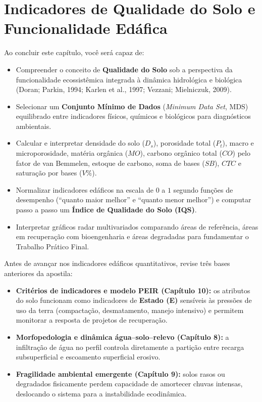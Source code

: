 \chapter{Indicadores de Qualidade do Solo e Funcionalidade Edáfica}
\label{cap:qualidade_solo}

\noindent\tagPratica
\vspace{4pt}

\begin{capObjetivos}
Ao concluir este capítulo, você será capaz de:
\begin{itemize}[leftmargin=1.5em, itemsep=2.5pt]
  \item Compreender o conceito de \textbf{Qualidade do Solo} sob a perspectiva da funcionalidade ecossistêmica integrada à dinâmica hidrológica e biológica (Doran; Parkin, 1994; Karlen et al., 1997; Vezzani; Mielniczuk, 2009).
  \item Selecionar um \textbf{Conjunto Mínimo de Dados} (\textit{Minimum Data Set}, MDS) equilibrado entre indicadores físicos, químicos e biológicos para diagnósticos ambientais.
  \item Calcular e interpretar densidade do solo ($D_s$), porosidade total ($P_t$), macro e microporosidade, matéria orgânica ($MO$), carbono orgânico total ($CO$) pelo fator de van Bemmelen, estoque de carbono, soma de bases ($SB$), $CTC$ e saturação por bases ($V\%$).
  \item Normalizar indicadores edáficos na escala de $0$ a $1$ segundo funções de desempenho (``quanto maior melhor'' e ``quanto menor melhor'') e computar passo a passo um \textbf{Índice de Qualidade do Solo (IQS)}.
  \item Interpretar gráficos radar multivariados comparando áreas de referência, áreas em recuperação com bioengenharia e áreas degradadas para fundamentar o Trabalho Prático Final.
\end{itemize}
\end{capObjetivos}

\begin{capRevisao}
Antes de avançar nos indicadores edáficos quantitativos, revise três bases anteriores da apostila:
\begin{itemize}[leftmargin=1.5em, itemsep=2.5pt]
  \item \textbf{Critérios de indicadores e modelo PEIR (Capítulo 10):} os atributos do solo funcionam como indicadores de \textbf{Estado (E)} sensíveis às pressões de uso da terra (compactação, desmatamento, manejo intensivo) e permitem monitorar a resposta de projetos de recuperação.
  \item \textbf{Morfopedologia e dinâmica água--solo--relevo (Capítulo 8):} a infiltração de água no perfil controla diretamente a partição entre recarga subsuperficial e escoamento superficial erosivo.
  \item \textbf{Fragilidade ambiental emergente (Capítulo 9):} solos rasos ou degradados fisicamente perdem capacidade de amortecer chuvas intensas, deslocando o sistema para a instabilidade ecodinâmica.
\end{itemize}
\end{capRevisao}

